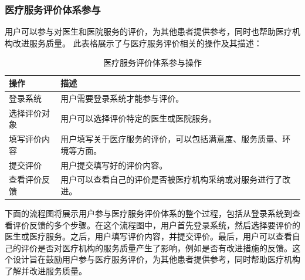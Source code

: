 \subsubsection{医疗服务评价体系参与}
用户可以参与对医生和医院服务的评价，为其他患者提供参考，同时也帮助医疗机构改进服务质量。
此表格展示了与医疗服务评价相关的操作及其描述：
\begin{table}[htbp]
	\centering
	\begin{tabular}{|p{6cm}|p{6cm}|}
		\hline
		\textbf{操作} & \textbf{描述} \\
		\hline
		登录系统 & 用户需要登录系统才能参与评价。 \\
		选择评价对象 & 用户可以选择评价特定的医生或医院服务。 \\
		填写评价内容 & 用户填写关于医疗服务的评价，可以包括满意度、服务质量、环境等方面。 \\
		提交评价 & 用户提交填写好的评价内容。 \\
		查看评价反馈 & 用户可以查看自己的评价是否被医疗机构采纳或对服务进行了改进。 \\
		\hline
	\end{tabular}
	\caption{医疗服务评价体系参与操作}
\end{table}
下面的流程图将展示用户参与医疗服务评价体系的整个过程，包括从登录系统到查看评价反馈的多个步骤。在这个流程图中，用户首先登录系统，然后选择要评价的医生或医疗服务。之后，用户填写评价内容，并提交评价。最后，用户可以查看自己的评价是否对医疗机构的服务质量产生了影响，例如是否有改进措施的反馈。这个设计旨在鼓励用户参与医疗服务评价，为其他患者提供参考，同时帮助医疗机构了解并改进服务质量。
